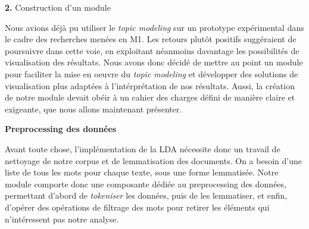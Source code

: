 \documentclass[letterpaper,portrait,12pt]{article}
\begin{document}
\textbf{2.} Construction d'un module





	Nous avions d\'{e}j\`{a} pu utiliser le \emph{topic modeling} sur un prototype exp\'{e}rimental dans le cadre des recherches men\'{e}es en M1. Les retours plut\^{o}t positifs sugg\'{e}raient de poursuivre dans cette voie, en exploitant n\'{e}anmoins davantage les possibilit\'{e}s de visualisation des r\'{e}sultats. Nous avons donc d\'{e}cid\'{e} de mettre au point un module pour faciliter la mise en oeuvre du \emph{topic modeling} et d\'{e}velopper des solutions de visualisation plus adapt\'{e}es \`{a} l'int\'{e}rpr\'{e}tation de nos r\'{e}sultats.  Aussi, la cr\'{e}ation de notre module devait ob\'{e}ir \`{a} un cahier des charges d\'{e}fini de mani\`{e}re claire et exigeante, que nous allons maintenant pr\'{e}senter.








	\textbf{Preprocessing des donn\'{e}es}


	Avant toute chose, l'impl\'{e}mentation de la LDA n\'{e}cessite donc un travail de nettoyage de notre corpus et de lemmatisation des documents. On a besoin d'une liste de tous les mots pour chaque texte, sous une forme lemmatis\'{e}e. Notre module comporte donc une composante d\'{e}di\'{e}e au preprocessing des donn\'{e}es, permettant d'abord de \emph{tokeniser }les donn\'{e}es, puis de les lemmatiser, et enfin, d'op\'{e}rer des op\'{e}rations de filtrage des mots pour retirer les \'{e}l\'{e}ments qui n'int\'{e}ressent pas notre analyse. 
\end{document}
